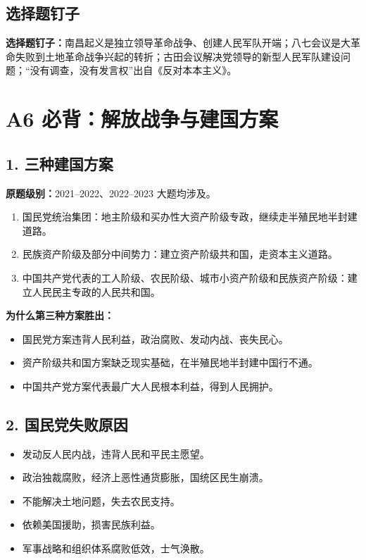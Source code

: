 \documentclass[UTF8,zihao=-4]{ctexart}
\newcommand{\exam}[1]{\textcolor{accent}{\bfseries 原题级别：}#1}
\newcommand{\pin}[1]{\textcolor{main}{\bfseries 选择题钉子：}#1}
\begin{document}
\subsection{选择题钉子}
\pin{南昌起义是独立领导革命战争、创建人民军队开端；八七会议是大革命失败到土地革命战争兴起的转折；古田会议解决党领导的新型人民军队建设问题；“没有调查，没有发言权”出自《反对本本主义》。}

\newpage

\section{A6 必背：解放战争与建国方案}

\subsection{1. 三种建国方案}
\exam{2021--2022、2022--2023 大题均涉及。}
\begin{enumerate}
  \item 国民党统治集团：地主阶级和买办性大资产阶级专政，继续走半殖民地半封建道路。
  \item 民族资产阶级及部分中间势力：建立资产阶级共和国，走资本主义道路。
  \item 中国共产党代表的工人阶级、农民阶级、城市小资产阶级和民族资产阶级：建立人民民主专政的人民共和国。
\end{enumerate}

\textbf{为什么第三种方案胜出：}
\begin{itemize}
  \item 国民党方案违背人民利益，政治腐败、发动内战、丧失民心。
  \item 资产阶级共和国方案缺乏现实基础，在半殖民地半封建中国行不通。
  \item 中国共产党方案代表最广大人民根本利益，得到人民拥护。
\end{itemize}

\subsection{2. 国民党失败原因}
\begin{itemize}
  \item 发动反人民内战，违背人民和平民主愿望。
  \item 政治独裁腐败，经济上恶性通货膨胀，国统区民生崩溃。
  \item 不能解决土地问题，失去农民支持。
  \item 依赖美国援助，损害民族利益。
  \item 军事战略和组织体系腐败低效，士气涣散。
\end{itemize}
\end{document}
